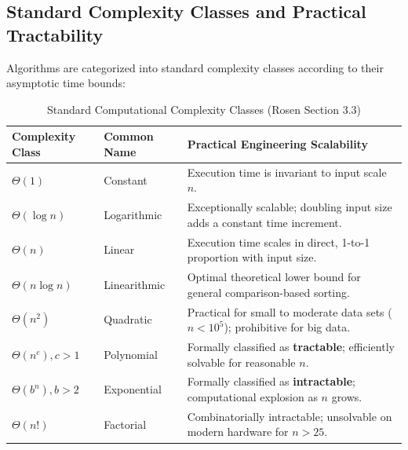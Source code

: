 \documentclass[10pt,a4paper]{article}
\theoremstyle{definition}
\begin{document}
\subsection{Standard Complexity Classes and Practical Tractability}
Algorithms are categorized into standard complexity classes according to their asymptotic time bounds:

\begin{table}[htbp]
\centering
\small
\caption{Standard Computational Complexity Classes (Rosen Section 3.3)}
\label{tab:classes}
\vspace{2pt}
\begin{tabular}{@{}lll@{}}
\toprule
\textbf{Complexity Class} & \textbf{Common Name} & \textbf{Practical Engineering Scalability} \\
\midrule
$\Theta(1)$ & Constant & Execution time is invariant to input scale $n$. \\
$\Theta(\log n)$ & Logarithmic & Exceptionally scalable; doubling input size adds a constant time increment. \\
$\Theta(n)$ & Linear & Execution time scales in direct, 1-to-1 proportion with input size. \\
$\Theta(n \log n)$ & Linearithmic & Optimal theoretical lower bound for general comparison-based sorting. \\
$\Theta(n^2)$ & Quadratic & Practical for small to moderate data sets ($n < 10^5$); prohibitive for big data. \\
$\Theta(n^c), c > 1$ & Polynomial & Formally classified as \textbf{tractable}; efficiently solvable for reasonable $n$. \\
$\Theta(b^n), b > 2$ & Exponential & Formally classified as \textbf{intractable}; computational explosion as $n$ grows. \\
$\Theta(n!)$ & Factorial & Combinatorially intractable; unsolvable on modern hardware for $n > 25$. \\
\bottomrule
\end{tabular}
\end{table}
\end{document}
